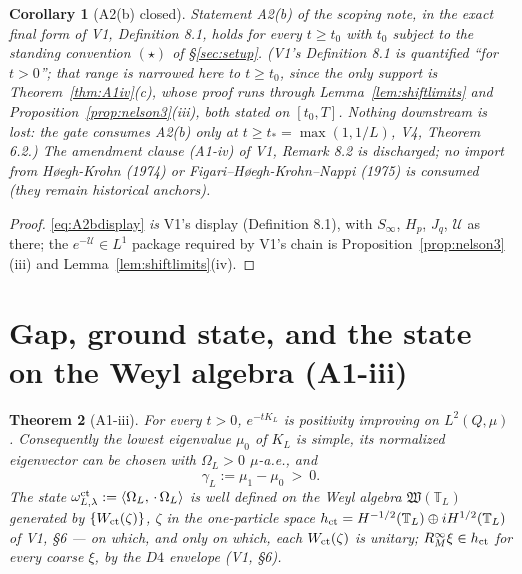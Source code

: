 \documentclass[11pt,a4paper]{article}
\theoremstyle{plain}
\newtheorem{theorem}{Theorem}[section]
\newtheorem{corollary}[theorem]{Corollary}
\theoremstyle{definition}
\newcommand{\T}{\mathbb{T}}
\newcommand{\U}{\mathcal U}
\newcommand{\ip}[2]{\langle #1,#2\rangle}
\newcommand{\muv}{\mu}
\begin{document}
\begin{corollary}[A2(b) closed]\label{cor:A2b}
Statement A2(b) of the scoping note, in the exact final form of V1,
Definition 8.1, holds for every $t\ge t_0$ with $t_0$ subject to the standing
convention $(\star)$ of \S\ref{sec:setup}. (V1's Definition 8.1 is quantified
``for $t>0$''; that range is narrowed here to $t\ge t_0$, since the only support is
Theorem~\ref{thm:A1iv}(c), whose proof runs through Lemma~\ref{lem:shiftlimits} and
Proposition~\ref{prop:nelson3}(iii), both stated on $[t_0,T]$. Nothing downstream is
lost: the gate consumes A2(b) only at $t\ge t_*=\max(1,1/L)$, V4,
Theorem 6.2.) The amendment clause (A1-iv) of V1, Remark 8.2 is
discharged; no import from H{\o}egh-Krohn (1974) or
Figari--H{\o}egh-Krohn--Nappi (1975) is consumed (they remain historical
anchors).
\end{corollary}

\begin{proof}
\eqref{eq:A2bdisplay} \emph{is} V1's display (Definition 8.1), with
$S_\infty$, $H_p$, $J_q$, $\U$ as there; the $e^{-\U}\in L^1$ package
required by V1's chain is Proposition~\ref{prop:nelson3}(iii) and
Lemma~\ref{lem:shiftlimits}(iv).
\end{proof}

\section{Gap, ground state, and the state on the Weyl algebra
(A1-iii)}\label{sec:gap}

\begin{theorem}[A1-iii]\label{thm:A1iii}
For every $t>0$, $e^{-tK_L}$ is positivity improving on $L^2(Q,\muv)$.
Consequently the lowest eigenvalue $\mu_0$ of $K_L$ is simple, its
normalized eigenvector can be chosen with $\Omega_L>0$ $\muv$-a.e., and
\[
 \gamma_L:=\mu_1-\mu_0\ >\ 0 .
\]
The state $\omega^{\rm ct}_{L,\lambda}:=\ip{\Omega_L}{\,\cdot\,
\Omega_L}$ is well defined on the Weyl algebra $\mathfrak W(\T_L)$
generated by $\{W_{\rm ct}(\zeta)\}$, $\zeta$ in the one-particle space
$h_{\rm ct}=H^{-1/2}(\T_L)\oplus iH^{1/2}(\T_L)$ of V1, \S6 --- on which, and only
on which, each $W_{\rm ct}(\zeta)$ is unitary; $R_M^\infty\xi\in h_{\rm ct}$ for every
coarse $\xi$, by the $D4$ envelope (V1, \S6).
\end{theorem}
\end{document}
